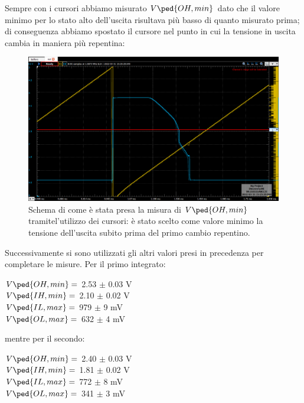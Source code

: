 \documentclass[10pt, a4paper, italian]{article}
\begin{document}
Sempre con i cursori abbiamo misurato $V\ped{OH, min}$ dato che il valore
minimo per lo stato alto dell'uscita risultava più basso di
quanto misurato prima; di conseguenza abbiamo spostato il cursore nel punto
in cui la tensione in uscita cambia in maniera più repentina:
\begin{figure}
\centering
	\includegraphics[scale=0.4]{trans1}
	\caption{\label{fig: trans1}Schema di come è stata presa la misura di $V\ped{OH, min}$ tramitel'utilizzo dei cursori: è stato scelto come valore minimo la tensione dell'uscita subito prima del primo cambio repentino.}
	
\end{figure}
Successivamente si sono utilizzati gli altri valori presi in precedenza per completare le misure.
Per il primo integrato:
\begin{multicols}{2}
    \centering
    $V\ped{OH, min}=$ 2.53 $\pm$ 0.03 V\\
    $V\ped{IH, min}=$ 2.10 $\pm$ 0.02 V\\
    
    $V\ped{IL, max}=$ 979 $\pm$ 9 mV\\
    $V\ped{OL, max}=$ 632 $\pm$ 4 mV\\
\end{multicols}
mentre per il secondo:
\begin{multicols}{2}
    \centering
    $V\ped{OH, min}=$ 2.40 $\pm$ 0.03 V\\
    $V\ped{IH, min}=$ 1.81 $\pm$ 0.02 V\\
    
    $V\ped{IL, max}=$ 772 $\pm$ 8 mV\\
    $V\ped{OL, max}=$ 341 $\pm$ 3 mV\\
\end{multicols}
\end{document}
